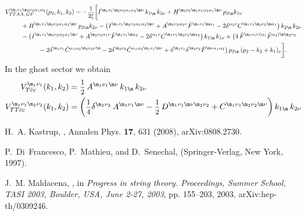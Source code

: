 \documentclass[a4paper,11pt,openright,twoside]{book}
\let\a=\alpha   \let\b=\beta   \let\g=\gamma   \let\d=\delta
\let\n=\nu      \let\x=\xi     \let\p=\pi      \let\r=\rho
\newcommand{\sdfrac}[2]{\mbox{\small$\displaystyle\frac{#1}{#2}$}}
\numberwithin{equation}{section}
\begin{document}
{{\begin{align}
	V^{\m_1\n_1\m_2\n_2\a_1\a_2}_{TTAA,\,GF}(p_2,k_1,k_2)&=-\sdfrac{1}{2\xi}\bigg[I^{\m_1\n_1\m_2\n_2\a_1\a_2\m\n}\,k_{1\m}\,k_{2\n}+H^{\m_2\n_2\m_1\n_1\a_2\a_1\m\n}\,p_{2\m}k_{1\n}\notag\\
	&\hspace{-3cm}+H^{\m_1\n_1\m_2\n_2\a_1\a_2\m\n}\,p_{2\m}k_{2\n}-\big(I^{\m_1\n_1\m_2\n_2\a_1\a_2\m\n}+A^{\m_2\n_2\a_2\n}\tilde{F}^{\m_1\n_1\m\a_1}-2\d^{\a_2\n}C^{\m_1\n_1\m_2\n_2\m\a_1}\big)\,k_{2\m}\,k_{2\n}\notag\\
	&\hspace{-3cm}-\big(I^{\m_1\n_1\m_2\n_2\a_2\a_1\m\n}+A^{\m_2\n_2\a_1\n}\tilde{F}^{\m_1\n_1\m\a_2}-2\d^{\a_1\n}C^{\m_1\n_1\m_2\n_2\m\a_2}\big)\,k_{1\m}\,k_{1\n}+\big(4\,\tilde{F}^{\m_1\n_1\n(\a_1}\tilde{F}^{\a_2)\m\m_2\n_2}\notag\\
	&\hspace{-2cm}-2\d^{\m_1\n_1}\tilde{C}^{\a_1\a_2\m_2\n_2\n\m}-2\d^{\m_2\n_2}\tilde{C}^{\a_1\a_2\m_1\n_1\m\n}+\d^{\m_1\n_1}\d^{\m_2\n_2}\tilde{F}^{\m\n\a_1\a_2}\big)\,p_{2\m}\,(p_2-k_2+k_1)_\n
	\bigg].
\end{align}
In the ghost sector we obtain
\begin{align}
	V^{\m_1\n_1}_{T\bar cc}(k_1,k_2)&=\sdfrac{1}{2}\,A^{\m_1\n_1\m\n}\,k_{1\m}\,k_{2\n}\\
	V^{\m_1\n_1\m_2\n_2}_{TT\bar cc}(k_1,k_2)&=\bigg(\sdfrac{1}{4}\d^{\m_2\n_2}\,A^{\m_1\n_1\m\n}-\sdfrac{1}{2}\,D^{\m_1\n_1\m\n\m_2\n_2}+C^{\m_1\n_1\m_2\n_2\m\n}\bigg)\,k_{1\m}\,k_{2\n}
\end{align}

\begin{thebibliography}{100}
	
	H.~A. Kastrup,
	,
	\newblock Annalen Phys. {\bf 17}, 631 (2008), arXiv:0808.2730.
	
	P.~Di~Francesco, P.~Mathieu, and D.~Senechal,
	 (Springer-Verlag, New York, 1997).
	
	J.~M. Maldacena,
	,
	\newblock in {\em {Progress in string theory. Proceedings, Summer School, TASI
			2003, Boulder, USA, June 2-27, 2003}}, pp. 155--203, 2003,
	arXiv:hep-th/0309246.
	

\end{thebibliography}}}
\end{document}
